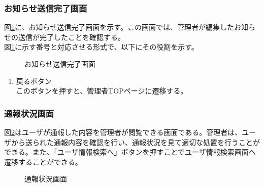 \documentclass[a4j]{jarticle}
\begin{document}
\subsubsection{お知らせ送信完了画面}
図\ref{fig:news_edit_ok}に、お知らせ送信完了画面を示す。この画面では、管理者が編集したお知らせの送信が完了したことを確認する。\\
図\ref{fig:news_edit_ok}に示す番号と対応させる形式で、以下にその役割を示す。
\begin{figure}[H]
\centering
{}
\caption{お知らせ送信完了画面}
\label{fig:news_edit_ok}
\end{figure}
\begin{enumerate}
  \renewcommand{\labelenumi}{\textcircled{\scriptsize \theenumi}}
  \item 戻るボタン\\
  このボタンを押すと、管理者TOPページに遷移する。
\end{enumerate}

\subsubsection{通報状況画面}
図\ref{fig:report_admin}はユーザが通報した内容を管理者が閲覧できる画面である。管理者は、ユーザから送られた通報内容を確認を行い、通報状況を見て適切な処置を行うことができる。また、「ユーザ情報検索へ」ボタンを押すことでユーザ情報検索画面へ遷移することができる。
\begin{figure}[H]
\begin{center}
\caption{通報状況画面}
\label{fig:report_admin}
\end{center}
\end{figure}
\end{document}
